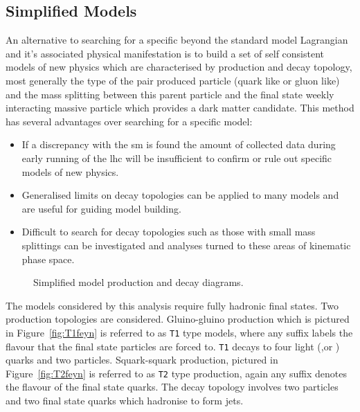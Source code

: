 \subsection{Simplified Models} %
\label{sub:simplified_models}
\cite{ArkaniHamed:2007fw}
An alternative to searching for a specific beyond the standard model Lagrangian 
and it's associated physical manifestation is to build a set of self consistent 
models of new physics which are characterised by production and decay topology, 
most generally the type of the pair produced particle (quark like or gluon 
like) and the mass splitting between this parent particle and the final state 
weekly interacting massive particle which provides a dark matter candidate.
This method has several advantages over searching for a specific model:
\begin{itemize}
\item If a discrepancy with the \ac{sm} is found the amount of collected data 
during early running of the \ac{lhc} will be insufficient to confirm or rule 
out specific models of new physics.
\item Generalised limits on decay topologies can be applied to many models and 
are useful for guiding model building.
\item Difficult to search for decay topologies such as those with small mass 
splittings can be investigated and analyses turned to these areas of kinematic 
phase space.
\end{itemize}



\begin{figure}[h!]
    \centering
    \caption{Simplified model production and decay diagrams.}
    \label{fig:T1T2feyn}
\end{figure}



The models considered by this analysis require fully hadronic final states. Two 
production topologies are considered. Gluino-gluino production which is 
pictured in Figure~\ref{fig:T1feyn} is referred to as \texttt{T1} type models, 
where any suffix labels the flavour that the final state particles are forced 
to. \texttt{T1} decays to four light (\Pup,\Pdown or \Pcharm) quarks and two 
\PSneutralino particles.
Squark-squark production, pictured in Figure~\ref{fig:T2feyn} is referred to as 
\texttt{T2} type production, again 
any suffix denotes the flavour of the final state quarks. The decay topology 
involves two \PSneutralino particles and two final state quarks which hadronise 
to form jets.

